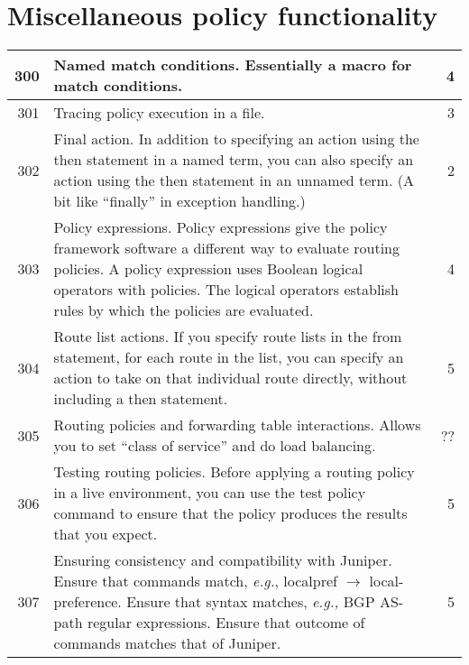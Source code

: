 \documentclass[letterpaper]{article}
\begin{document}
\section{Miscellaneous policy functionality}
\begin{center}
\tabletail{
\hline
}
\begin{supertabular}{|r |p{12cm} |r|}
\hline

300 &
Named match conditions.  Essentially a macro for match conditions.
& 4 \\
\hline

301 &
Tracing policy execution in a file.
& 3 \\
\hline

302 &
Final action.  In addition to specifying an action using the then statement in a
named term, you can also specify an action using the then statement in an
unnamed term.  (A bit like ``finally'' in exception handling.)
& 2 \\
\hline

303 &
Policy expressions.  Policy expressions give the policy framework software a
different way to evaluate routing policies. A policy expression uses Boolean
logical operators with policies. The logical operators establish rules by which
the policies are evaluated.
& 4 \\
\hline

304 &
Route list actions.  If you specify route lists in the from statement, for each
route in the list, you can specify an action to take on that individual route
directly, without including a then statement.
& 5 \\
\hline

305 &
Routing policies and forwarding table interactions.  Allows you to set ``class
of service'' and do load balancing.
& ?? \\
\hline

306 &
Testing routing policies.  Before applying a routing policy in a live
environment, you can use the test policy command to ensure that the policy
produces the results that you expect. 
& 5 \\
\hline

307 &
Ensuring consistency and compatibility with Juniper.  Ensure that commands
match, {\em e.g.}, localpref $\to$ local-preference.  Ensure that syntax
matches, {\em e.g.,} BGP AS-path regular expressions.  Ensure that outcome of
commands matches that of Juniper.
& 5 \\
\hline


\end{supertabular}
\end{center}
\end{document}
